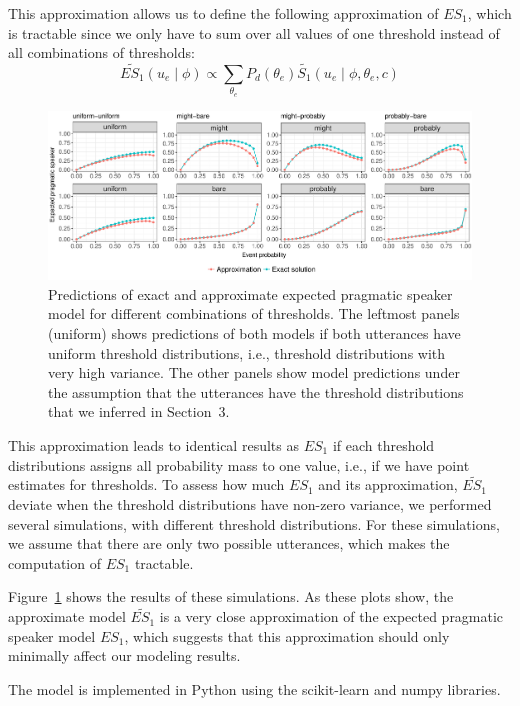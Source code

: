 \documentclass[man, floatsintext]{apa6}
\begin{document}
This approximation allows us to define the following approximation of $ES_1$, which is tractable since we only have to sum over
all values of one threshold instead of all combinations of thresholds:
$$\widetilde{ES_1}(u_e \mid \phi) \propto  \sum_{\theta_e} P_{d}(\theta_e) \widetilde{S_1}\left(u _e\mid \phi, \theta_e, c\right)$$

\begin{figure}[h!]
\includegraphics[width=\textwidth]{plots/approx-simulations.pdf}
\caption{Predictions of exact and approximate expected pragmatic speaker model for different combinations of thresholds. The leftmost panels (uniform) shows predictions of both models if both utterances have uniform threshold distributions, i.e., threshold distributions with very high variance. The other panels show model predictions under the assumption that the utterances have the threshold distributions that we inferred in Section~3. \label{fig:approx-simulations}}
\end{figure}

This approximation leads to identical results as $ES_1$ if each threshold distributions assigns all probability mass to one value, 
i.e., if we have point estimates for thresholds. To assess how much $ES_1$ and its approximation, $\widetilde{ES_1}$ deviate when 
the threshold distributions have non-zero variance, we performed several simulations, with different threshold distributions. For these
simulations, we assume that there are only two possible utterances, which makes the computation of $ES_1$ tractable.

Figure~\ref{fig:approx-simulations} shows the results of these simulations. As these plots show, the approximate model $\widetilde{ES_1}$ is a very close approximation of the expected
pragmatic speaker model $ES_1$, which suggests that this approximation should only minimally affect our modeling results. 

The model is implemented in Python using the scikit-learn \parencite{Scikit2011} and numpy \parencite{vanderWalt2011} libraries.
\end{document}
